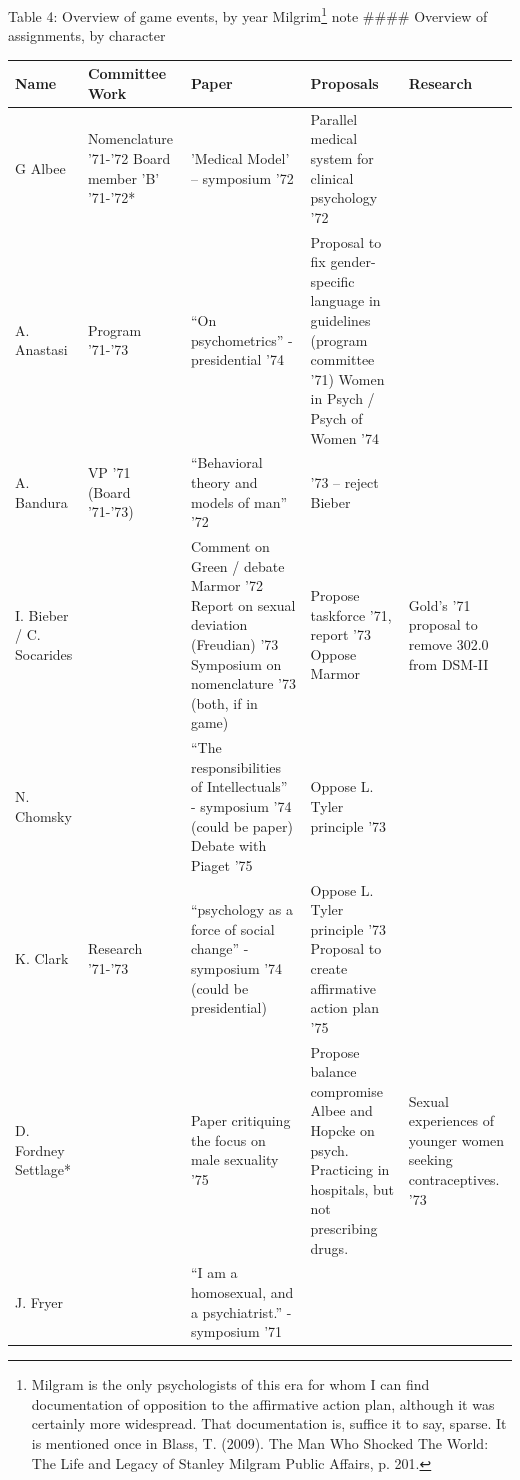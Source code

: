 Table 4: Overview of game events, by year
 Milgrim\footnote{Milgram is the only psychologists of this era for whom I can find documentation of opposition to the affirmative action plan, although it was certainly more widespread. That documentation is, suffice it to say, sparse. It is mentioned once in Blass, T. (2009). The Man Who Shocked The World: The Life and Legacy of Stanley Milgram Public Affairs, p. 201.} note
 \#\#\#\# Overview of assignments, by character
 \begin{longtable}[!t]{ | p{1cm} | p{2cm} | p{1cm} |  p{3cm} |  p{3cm} | }
\hline
Name&
Committee Work&
Paper&
Proposals&
Research\\ \hline
G Albee&
Nomenclature '71-'72 \newline
Board member 'B' '71-'72*&
'Medical Model' – symposium '72&
Parallel medical system for clinical psychology '72&
\\
A. Anastasi&
Program '71-'73&
“On psychometrics” - presidential '74&
Proposal to fix gender-specific language in guidelines (program committee '71)
Women in Psych / Psych of Women '74&
\\
A. Bandura&
VP '71\newline
(Board '71-'73)&
“Behavioral theory and models of man” '72&
'73 – reject Bieber&
\\
I. Bieber /
C. Socarides&
&
Comment on Green / debate Marmor '72\newline
Report on sexual deviation (Freudian) '73
Symposium on nomenclature '73 (both, if in game)&
Propose taskforce '71, report '73\newline
Oppose Marmor & Gold's '71 proposal to remove 302.0 from DSM-II\\
N. Chomsky&
&
“The responsibilities of Intellectuals” - symposium '74 (could be paper)\newline
Debate with Piaget '75&
Oppose L. Tyler principle '73&
\\
K. Clark&
Research '71-'73&
“psychology as a force of social change” - symposium '74 (could be presidential)&
Oppose L. Tyler principle '73\newline
Proposal to create affirmative action plan '75&
\\
D. Fordney Settlage*&
&
Paper critiquing the focus on male sexuality '75&
Propose balance compromise Albee and Hopcke on psych. \newline Practicing in hospitals, but not prescribing drugs. &
Sexual experiences of younger women seeking contraceptives. '73\\
J. Fryer&
&
“I am a homosexual, and a psychiatrist.” - symposium '71&

\end{longtable}
